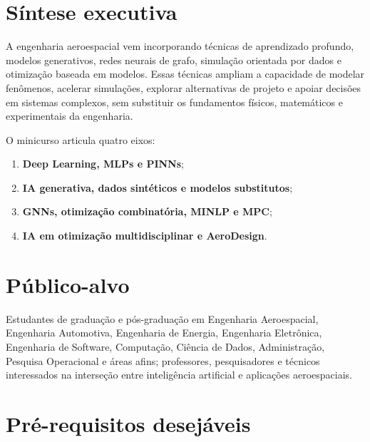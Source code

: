 \documentclass[
  brazilian,
  a4paper,
  DIV=11,
  numbers=noendperiod]{scrreprt}
\providecommand{\tightlist}{%
  \setlength{\itemsep}{0pt}\setlength{\parskip}{0pt}}
\begin{document}
\section*{Síntese executiva}\label{suxedntese-executiva}


A engenharia aeroespacial vem incorporando técnicas de aprendizado
profundo, modelos generativos, redes neurais de grafo, simulação
orientada por dados e otimização baseada em modelos. Essas técnicas
ampliam a capacidade de modelar fenômenos, acelerar simulações, explorar
alternativas de projeto e apoiar decisões em sistemas complexos, sem
substituir os fundamentos físicos, matemáticos e experimentais da
engenharia.

O minicurso articula quatro eixos:

\begin{enumerate}
\def\labelenumi{\arabic{enumi}.}
\tightlist
\item
  \textbf{Deep Learning, MLPs e PINNs};
\item
  \textbf{IA generativa, dados sintéticos e modelos substitutos};
\item
  \textbf{GNNs, otimização combinatória, MINLP e MPC};
\item
  \textbf{IA em otimização multidisciplinar e AeroDesign}.
\end{enumerate}

\section*{Público-alvo}\label{puxfablico-alvo}


Estudantes de graduação e pós-graduação em Engenharia Aeroespacial,
Engenharia Automotiva, Engenharia de Energia, Engenharia Eletrônica,
Engenharia de Software, Computação, Ciência de Dados, Administração,
Pesquisa Operacional e áreas afins; professores, pesquisadores e
técnicos interessados na interseção entre inteligência artificial e
aplicações aeroespaciais.

\section*{Pré-requisitos
desejáveis}\label{pruxe9-requisitos-desejuxe1veis}
\end{document}
